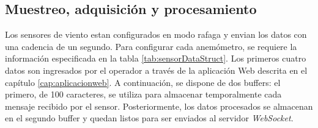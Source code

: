 



\subsection{Muestreo, adquisición y procesamiento}\label{sec:muestreo_adquisicion_procesamiento}

Los sensores de viento estan configurados en modo rafaga y envian los datos con una cadencia de un segundo. Para configurar cada anemómetro, se requiere la información especificada en la tabla \ref{tab:sensorDataStruct}. Los primeros cuatro datos son ingresados por el operador a través de la aplicación Web descrita en el capítulo \ref{cap:aplicacionweb}. A continuación, se dispone de dos buffers: el primero, de 100 caracteres, se utiliza para almacenar temporalmente cada mensaje recibido por el sensor. Posteriormente, los datos procesados se almacenan en el segundo buffer y quedan listos para ser enviados al servidor \textit{WebSocket}.


